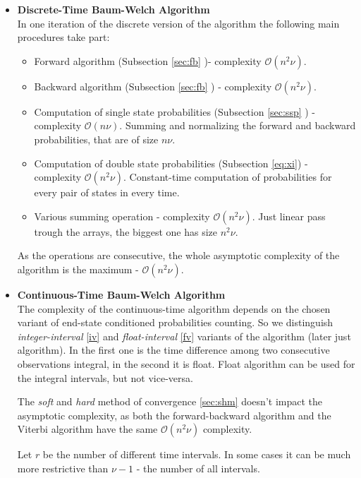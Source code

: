 \documentclass[thesis=M,english]{FITthesis}[2012/10/20]
\begin{document}
\begin{itemize}\label{it:dtc}
\item \textbf{ Discrete-Time Baum-Welch Algorithm } \\
In one iteration of the discrete version of the algorithm the following main procedures take part:
\begin{itemize}
\item Forward algorithm (Subsection \ref{sec:fb} )- complexity $\mathcal{O}(n^2\nu)$.
\item Backward algorithm (Subsection \ref{sec:fb} ) - complexity $\mathcal{O}(n^2\nu)$.
\item Computation of single state probabilities (Subsection \ref{sec:ssp} ) - complexity $\mathcal{O}(n\nu)$. Summing and normalizing the forward and backward probabilities, that are of size $n\nu$.
\item Computation of double state probabilities (Subsection \eqref{eq:xi}) - complexity $\mathcal{O}(n^2\nu)$. Constant-time computation of probabilities for every pair of states in every time.
\item Various summing operation - complexity $\mathcal{O}(n^2\nu)$. Just linear pass trough the arrays, the biggest one has size $n^2\nu$.
\end{itemize}

As the operations are consecutive, the whole asymptotic complexity of the algorithm is the maximum -  $\mathcal{O}(n^2\nu)$.

\item \textbf{ Continuous-Time Baum-Welch Algorithm } \\

The complexity of the continuous-time algorithm depends on the chosen variant of end-state conditioned probabilities counting. So we distinguish \textit{integer-interval} \ref{iv} and \textit{float-interval} \ref{fv} variants of the algorithm (later just algorithm). In the first one is the time difference among two consecutive observations integral, in the second it is float. Float algorithm can be used for the integral intervals, but not vice-versa. 

The \textit{soft} and \textit{hard} method of convergence \ref{sec:shm} doesn't impact the asymptotic complexity, as both the forward-backward algorithm and the Viterbi algorithm 
have the same $\mathcal{O}(n^2 \nu)$ complexity.

Let $r$ be the number of different time intervals. In some cases it can be much more restrictive than $\nu - 1$ - the number of all intervals.


\end{itemize}
\end{document}
